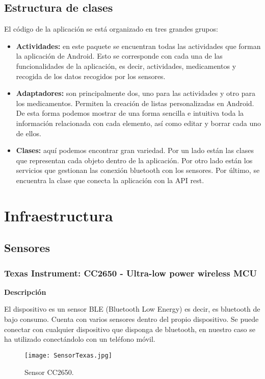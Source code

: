 \documentclass[11pt,spanish]{article}
\begin{document}
\subsection{Estructura de clases}
El código de la aplicación se está organizado en tres grandes grupos:

\begin{itemize}
	\item {\bf Actividades: } en este paquete se encuentran todas las actividades que forman la aplicación de Android. Esto se corresponde con cada una de las funcionalidades de la aplicación, es decir, actividades, medicamentos y recogida de los datos recogidos por los sensores.
    \item {\bf Adaptadores: } son principalmente dos, uno para las actividades y otro para los medicamentos. Permiten la creación de listas personalizadas en Android. De esta forma podemos mostrar de una forma sencilla e intuitiva toda la información relacionada con cada elemento, así como editar y borrar cada uno de ellos.
    \item {\bf Clases: } aquí podemos encontrar gran variedad. Por un lado están las clases que representan cada objeto dentro de la aplicación. Por otro lado están los servicios que gestionan las conexión bluetooth con los sensores. Por último, se encuentra la clase que conecta la aplicación con la API rest.
\end{itemize}

\section{Infraestructura}
\subsection{Sensores}
\subsubsection{Texas Instrument: CC2650 - Ultra-low power wireless MCU}
{\bf Descripción}
\newline

El dispositivo es un sensor BLE (Bluetooth Low Energy) es decir, es bluetooth de bajo consumo. Cuenta con varios sensores dentro del propio dispositivo. Se puede conectar con cualquier dispositivo que disponga de bluetooth, en nuestro caso se ha utilizado conectándolo con un teléfono móvil. 

\begin{figure}[h!]
  \centering
  \texttt{[image: SensorTexas.jpg]}
  \caption{Sensor CC2650.}
\end{figure}
\end{document}
